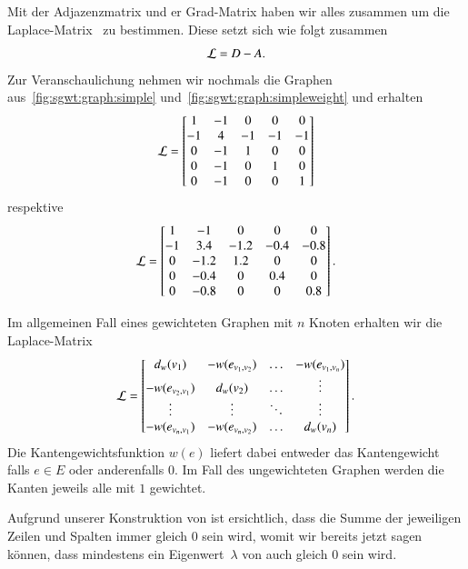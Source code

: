 Mit der Adjazenzmatrix und er Grad-Matrix haben wir alles zusammen um die 
Laplace-Matrix~\laplaceL{} zu bestimmen. Diese setzt sich wie folgt zusammen
\begin{equation}
\laplaceL = \degreeM - \adjacencyM.
\label{eq:sgwt:laplace}
\end{equation}
Zur Veranschaulichung nehmen wir nochmals die Graphen 
aus~\cref{fig:sgwt:graph:simple} und~\cref{fig:sgwt:graph:simpleweight} und 
erhalten
\begin{equation*}
\laplaceL =
\begin{bmatrix}
1 & -1 & 0 & 0 & 0 \\
-1 & 4 & -1 & -1 & -1 \\
0 & -1 & 1 & 0 & 0 \\
0 & -1 & 0 & 1 & 0 \\
0 & -1 & 0 & 0 & 1
\end{bmatrix}
\end{equation*}
respektive
\begin{equation*}
\laplaceL =
\begin{bmatrix}
1 & -1 & 0 & 0 & 0 \\
-1 & 3.4 & -1.2 & -0.4 & -0.8 \\
0 & -1.2 & 1.2 & 0 & 0 \\
0 & -0.4 & 0 & 0.4 & 0 \\
0 & -0.8 & 0 & 0 & 0.8
\end{bmatrix}.
\end{equation*}

Im allgemeinen Fall eines gewichteten Graphen mit $n$ Knoten erhalten wir die 
Laplace-Matrix
\begin{equation*}
\laplaceL =
\begin{bmatrix}
d_w(v_1) & -w(e_{v_1, v_2}) & \dotso & -w(e_{v_1, v_n}) \\
-w(e_{v_2, v_1}) & d_w(v_2) & \dotso & \vdots \\
\vdots & \vdots & \ddots &  \vdots \\
-w(e_{v_n, v_1}) & -w(e_{v_n, v_2}) & \dotso & d_w(v_n)
\end{bmatrix}.
\end{equation*}
Die Kantengewichtsfunktion $w(e)$ liefert dabei entweder das Kantengewicht 
falls $e \in E$ oder anderenfalls $0$. Im Fall des ungewichteten Graphen werden 
die Kanten jeweils alle mit $1$ gewichtet.

Aufgrund unserer Konstruktion von \laplaceL{} ist ersichtlich, dass die Summe 
der jeweiligen Zeilen und Spalten immer gleich $0$ sein wird, womit wir bereits 
jetzt sagen k\"onnen, dass mindestens ein Eigenwert~$\lambda$ von \laplaceL{} 
auch gleich $0$ sein wird.

